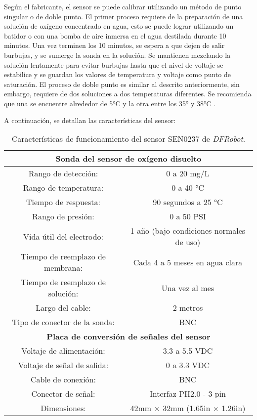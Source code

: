 Según el fabricante, el sensor se puede calibrar utilizando un método de punto singular o de doble punto. El primer proceso requiere de la preparación de una solución de oxígeno concentrado en agua, esto se puede lograr utilizando un batidor o con una bomba de aire inmersa en el agua destilada durante 10 minutos. Una vez terminen los 10 minutos, se espera a que dejen de salir burbujas, y se sumerge la sonda en la solución. Se mantienen mezclando la solución lentamente para evitar burbujas hasta que el nivel de voltaje se estabilice y se guardan los valores de temperatura y voltaje como punto de saturación. El proceso de doble punto es similar al descrito anteriormente, sin embargo, requiere de dos soluciones a dos temperaturas diferentes. Se recomienda que una se encuentre alrededor de 5°C y la otra entre los 35° y 38°C \cite{DFRobot_DOsensor}. 

A continuación, se detallan las características del sensor:

\begin{table}[H]
	\centering
	\begin{tabular}{|c|c|}
		\hline
		\multicolumn{2}{|c|}{\textbf{Sonda del sensor de oxígeno disuelto}}\\ \hline
		Rango de detección: & 0 a 20 mg/L \\ \hline
		Rango de temperatura: & 0 a 40 °C \\ \hline
		Tiempo de respuesta: & 90 segundos a 25 °C \\ \hline
		Rango de presión: & 0 a 50 PSI \\ \hline
		Vida útil del electrodo: & 1 año (bajo condiciones normales de uso) \\ \hline
		Tiempo de reemplazo de membrana: & Cada 4 a 5 meses en agua clara \\ \hline
		Tiempo de reemplazo de solución: & Una vez al mes \\ \hline
		Largo del cable: & 2 metros \\ \hline
		Tipo de conector de la sonda: & BNC \\ \hline
		\multicolumn{2}{|c|}{\textbf{Placa de conversión de señales del sensor}}\\ \hline 
		Voltaje de alimentación: & 3.3 a 5.5 VDC \\ \hline
		Voltaje de señal de salida: & 0 a 3.3 VDC \\ \hline
		Cable de conexión: & BNC \\ \hline
		Conector de señal: & Interfaz PH2.0 - 3 pin \\ \hline
		Dimensiones: & 42mm $\times$ 32mm (1.65in $\times$ 1.26in) \\ \hline
	\end{tabular}
	\caption{Características de funcionamiento del sensor SEN0237 de \textit{DFRobot}.}
	\label{Cuadro1}
\end{table}

